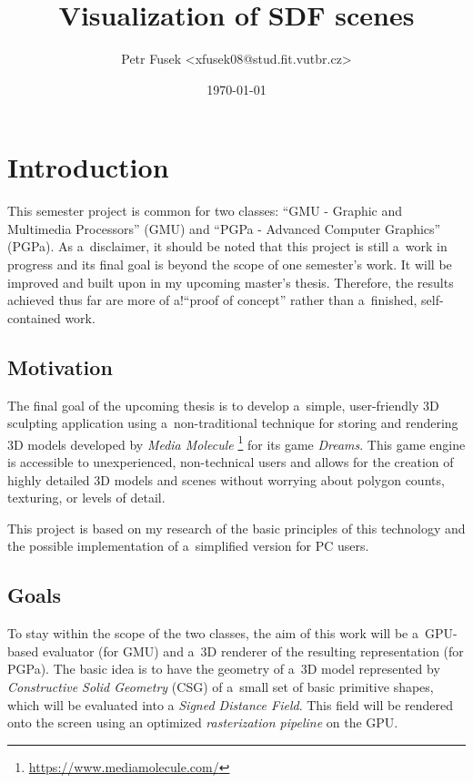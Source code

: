 \documentclass[11pt, a4paper]{article}
\title{Visualization of SDF scenes}
\author{Petr Fusek <xfusek08@stud.fit.vutbr.cz>}
\date{\today}
\renewcommand{\uv}[1]{``#1''}
\begin{document}
\maketitle

\section{Introduction}

This semester project is common for two classes: \uv{GMU - Graphic and Multimedia Processors} (GMU) and \uv{PGPa - Advanced Computer Graphics} (PGPa).
As a~disclaimer, it should be noted that this project is still a~work in progress and its final goal is beyond the scope of one semester's work. It will be improved and built upon in my upcoming master's thesis.
Therefore, the results achieved thus far are more of a!\uv{proof of concept} rather than a~finished, self-contained work.

\subsection{Motivation}

The final goal of the upcoming thesis is to develop a~simple, user-friendly 3D sculpting application using a~non-traditional technique for storing and rendering 3D models developed by \emph{Media Molecule} \footnote{\href{https://www.mediamolecule.com/}{https://www.mediamolecule.com/}} for its game \emph{Dreams}{\texttrademark}.
This game engine is accessible to unexperienced, non-technical users and allows for the creation of highly detailed 3D models and scenes without worrying about polygon counts, texturing, or levels of detail.

This project is based on my research of the basic principles of this technology and the possible implementation of a~simplified version for PC users.

\subsection{Goals}

To stay within the scope of the two classes, the aim of this work will be a~GPU-based evaluator (for GMU) and a~3D renderer of the resulting representation (for PGPa).
The basic idea is to have the geometry of a~3D model represented by \emph{Constructive Solid Geometry} (CSG) of a~small set of basic primitive shapes, which will be evaluated into a \emph{Signed Distance Field}. This field will be rendered onto the screen using an optimized \emph{rasterization pipeline} on the GPU.
\end{document}
